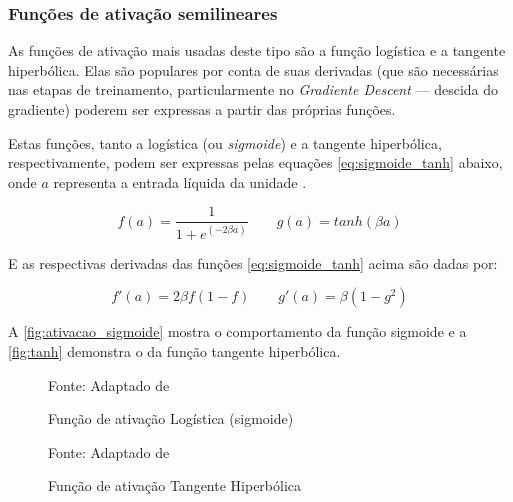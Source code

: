 \subsubsection{Funções de ativação semilineares}\label{ativacao_semilinear}
As funções de ativação mais usadas deste tipo são a função logística e a tangente hiperbólica. Elas são populares por conta de suas derivadas (que são necessárias nas etapas de treinamento, particularmente no \textit{Gradiente Descent} --- descida do gradiente) poderem ser expressas a partir das próprias funções.

Estas funções, tanto a logística (ou \textit{sigmoide}) e a tangente hiperbólica, respectivamente, podem ser expressas pelas equações \ref{eq:sigmoide_tanh} abaixo, onde $a$ representa a entrada líquida da unidade \cite{haykin_redes_2001} \cite{lima_ia_2016}.

\begin{equation}\label{eq:sigmoide_tanh}
	f(a) = \frac{1}{1+ e^{(-2 \beta a)}} \qquad g(a) = tanh(\beta a)
\end{equation}

E as respectivas derivadas das funções \ref{eq:sigmoide_tanh} acima são dadas por:

\begin{equation}\label{derivadas_sigmoide_tanh}
	f'(a) = 2 \beta f(1-f) \qquad g'(a) = \beta (1-g^2)
\end{equation}

A \autoref{fig:ativacao_sigmoide} mostra o comportamento da função sigmoide e a \autoref{fig:tanh} demonstra o da função tangente hiperbólica.

\begin{figure}[h!]
	\centering
	\caption{Função de ativação Logística (sigmoide)}
	
	{\scriptsize 	Fonte: Adaptado de }
	\label{fig:ativacao_sigmoide}
\end{figure}

\begin{figure}[h!]
	\centering
	\caption{Função de ativação Tangente Hiperbólica}
	
	{\scriptsize 	Fonte: Adaptado de }
	\label{fig:tanh}
\end{figure}

